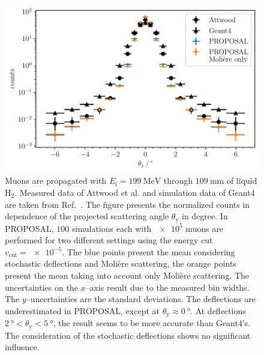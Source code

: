 \begin{figure}
    \centering 
    \includegraphics{../../deflection/plots/FINAL/attwood_comparison_moliere_199MeV_final_multi_mean_deg.pdf}
    \caption{
    Muons are 
    propagated with $E_{\mathrm{i}} = \SI{199}{\mega\electronvolt}$ through 
    $\SI{109}{\milli\meter}$ of liquid $\text{H}_2$.
    Measured data of Attwood et al. and simulation data of Geant4 are taken from Ref.~\cite{attwood_2006}.    
    The figure presents 
    the normalized counts in dependence of the projected scattering angle $\theta_{\mathrm{y}}$ in degree.
    In PROPOSAL, $100$ simulations each with $\num{e5}$ muons are performed for two different settings using the energy cut 
    $v_{\mathrm{cut}} = \num{e-5}$. The blue points present the mean considering stochastic deflections and Molière scattering, the orange points
    present the mean taking into account only Molière scattering.   
    The uncertainties on the $x$--axis result due to the measured bin widths. The $y$--uncertainties are the standard deviations.   
    The deflections are  
    underestimated in PROPOSAL, except at $\theta_{\mathrm{y}} \approx \SI{0}{\degree}$. At deflections $\SI{2}{\degree} < \theta_{\mathrm{y}} < \SI{5}{\degree}$, 
    the result seems to be more accurate than Geant4's. The consideration of the stochastic deflections shows no significant influence.}
    \label{fig:attwood_comparison}
\end{figure}

